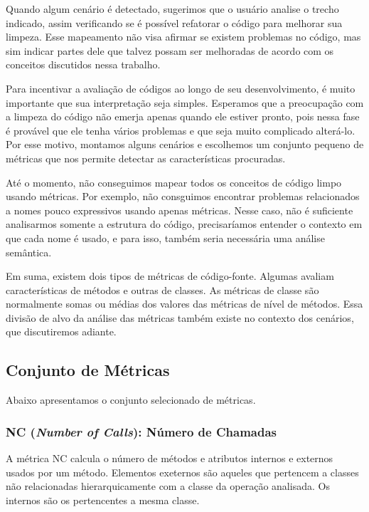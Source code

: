 Quando algum cenário é detectado, sugerimos que o usuário analise o trecho indicado, assim verificando se é possível refatorar o código para melhorar sua limpeza. Esse mapeamento não visa afirmar se existem problemas no código, mas sim indicar partes dele que talvez possam ser melhoradas de acordo com os conceitos discutidos nessa trabalho.

Para incentivar a avaliação de códigos ao longo de seu desenvolvimento, é muito importante que sua interpretação seja simples. Esperamos que a preocupação com a limpeza do código não emerja apenas quando ele estiver pronto, pois nessa fase é provável que ele tenha vários problemas e que seja muito complicado alterá-lo. Por esse motivo, montamos alguns cenários e escolhemos um conjunto pequeno de métricas que nos permite detectar as características procuradas.

Até o momento, não conseguimos mapear todos os conceitos de código limpo usando métricas. Por exemplo, não consguimos encontrar problemas relacionados a nomes pouco expressivos usando apenas métricas. Nesse caso, não é suficiente analisarmos somente a estrutura do código, precisaríamos entender o contexto em que cada nome é usado, e para isso, também seria necessária uma análise semântica.

Em suma, existem dois tipos de métricas de código-fonte. Algumas avaliam características de métodos e outras de classes. As métricas de classe são normalmente somas ou médias dos valores das métricas de nível de métodos. Essa divisão de alvo da análise das métricas também existe no contexto dos cenários, que discutiremos adiante.



\subsection{Conjunto de Métricas}

Abaixo apresentamos o conjunto selecionado de métricas.

\subsubsection{NC (\textit{Number of Calls}): Número de Chamadas}

A métrica NC calcula o número de métodos e atributos internos e externos usados por um método. Elementos exeternos são aqueles que pertencem a classes não relacionadas hierarquicamente com a classe da operação analisada. Os internos são os pertencentes a mesma classe.
                                                                 
